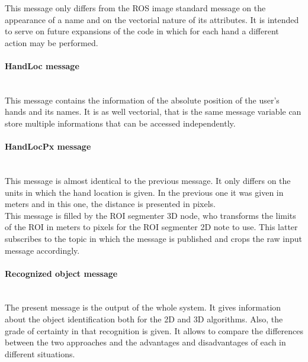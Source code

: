 		This message only differs from the ROS image standard message on the appearance of a name and on the vectorial nature of its attributes. It is intended to serve on future expansions of the code in which for each hand a different action may be performed. 

	\paragraph{HandLoc message}\mbox{} \\


		This message contains the information of the absolute position of the user's hands and its names. It is as well vectorial, that is the same message variable can store multiple informations that can be accessed independently.  

	\paragraph{HandLocPx message}\mbox{} \\
	


		This message is almost identical to the previous message. It only differs on the units in which the hand location is given. In the previous one it was given in meters and in this one, the distance is presented in pixels. 
		\\

		This message is filled by the ROI segmenter 3D node, who transforms the limits of the ROI in meters to pixels for the ROI segmenter 2D note to use. This latter subscribes to the topic in which the message is published and crops the raw input message accordingly. 

	\paragraph{Recognized object message}\mbox{}\\

		The present message is the output of the whole system. It gives information about the object identification both for the 2D and 3D algorithms. Also, the grade of certainty in that recognition is given. It allows to compare the differences between the two approaches and the advantages and disadvantages of each in different situations. 
